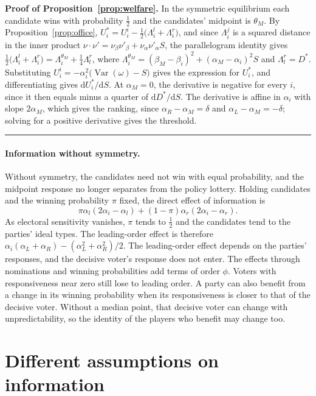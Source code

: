 \documentclass[12pt,letterpaper]{article}
\newenvironment{proof}[1][Proof]{\noindent\textbf{#1.} }{\ \rule{0.5em}{0.5em}}
\begin{document}
\begin{proof}[Proof of Proposition~\ref{prop:welfare}]
In the symmetric equilibrium each candidate wins with probability $\tfrac12$ and the candidates' midpoint is $\theta_M$. By Proposition~\ref{prop:office}, $U_i^*=U_i^i-\tfrac12\big(\Lambda_i^l+\Lambda_i^r\big)$, and since $\Lambda_i^j$ is a squared distance in the inner product $\nu\cdot\nu'=\nu_\beta\nu'_\beta+\nu_\alpha\nu'_\alpha S$, the parallelogram identity gives $\tfrac12\big(\Lambda_i^l+\Lambda_i^r\big)=\Lambda_i^{\theta_M}+\tfrac14\Lambda_l^r$, where $\Lambda_i^{\theta_M}=(\beta_M-\beta_i)^2+(\alpha_M-\alpha_i)^2S$ and $\Lambda_l^r=D^*$. Substituting $U_i^i=-\alpha_i^2\big(\operatorname{Var}(\omega)-S\big)$ gives the expression for $U_i^*$, and differentiating gives $\mathrm{d}U_i^*/\mathrm{d}S$. At $\alpha_M=0$, the derivative is negative for every $i$, since it then equals minus a quarter of $\mathrm{d}D^*/\mathrm{d}S$. The derivative is affine in $\alpha_i$ with slope $2\alpha_M$, which gives the ranking, since $\alpha_R-\alpha_M=\delta$ and $\alpha_L-\alpha_M=-\delta$; solving for a positive derivative gives the threshold.
\end{proof}

\paragraph{Information without symmetry.}
Without symmetry, the candidates need not win with equal probability, and the midpoint response no longer separates from the policy lottery. Holding candidates and the winning probability $\pi$ fixed, the direct effect of information is
\[
\pi\alpha_l(2\alpha_i-\alpha_l)+(1-\pi)\alpha_r(2\alpha_i-\alpha_r).
\]
As electoral sensitivity vanishes, $\pi$ tends to $\tfrac12$ and the candidates tend to the parties' ideal types. The leading-order effect is therefore $\alpha_i(\alpha_L+\alpha_R)-(\alpha_L^2+\alpha_R^2)/2$. The leading-order effect depends on the parties' responses, and the decisive voter's response does not enter. The effects through nominations and winning probabilities add terms of order $\phi$. Voters with responsiveness near zero still lose to leading order. A party can also benefit from a change in its winning probability when its responsiveness is closer to that of the decisive voter. Without a median point, that decisive voter can change with unpredictability, so the identity of the players who benefit may change too.

\section{Different assumptions on information}
\end{document}
